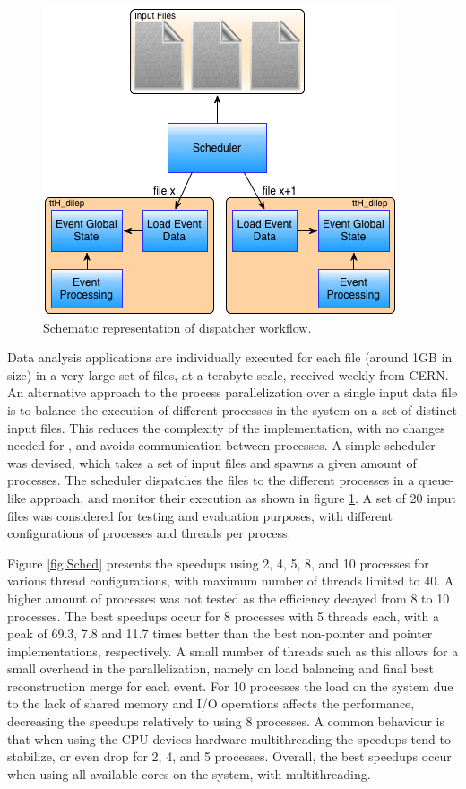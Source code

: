 \begin{figure}[!htp]
	\begin{center}
		\includegraphics[scale=0.5]{images/scheduler_workflow.png}
		\caption{Schematic representation of dispatcher workflow.}
		\label{fig:sched_flow}
	\end{center}
\end{figure}

Data analysis applications are individually executed for each file (around 1GB in size) in a very large set of files, at a terabyte scale, received weekly from CERN. An alternative approach to the process parallelization over a single input data file is to balance the execution of different \tth processes in the system on a set of distinct input files. This reduces the complexity of the implementation, with no changes needed for \tth, and avoids communication between processes. A simple scheduler was devised, which takes a set of input files and spawns a given amount of \tth processes. The scheduler dispatches the files to the different processes in a queue-like approach, and monitor their execution as shown in figure \ref{fig:sched_flow}. A set of 20 input files was considered for testing and evaluation purposes, with different configurations of processes and threads per process.

Figure \ref{fig:Sched} presents the speedups using 2, 4, 5, 8, and 10 processes for various thread configurations, with maximum number of threads limited to 40. A higher amount of processes was not tested as the efficiency decayed from 8 to 10 processes. The best speedups occur for 8 processes with 5 threads each, with a peak of 69.3, 7.8 and 11.7 times better than the best non-pointer and pointer implementations, respectively. A small number of threads such as this allows for a small overhead in the \tth parallelization, namely on load balancing and final best reconstruction merge for each event. For 10 processes the load on the system due to the lack of shared memory and I/O operations affects the performance, decreasing the speedups relatively to using 8 processes. A common behaviour is that when using the CPU devices hardware multithreading the speedups tend to stabilize, or even drop for 2, 4, and 5 processes. Overall, the best speedups occur when using all available cores on the system, with multithreading.

